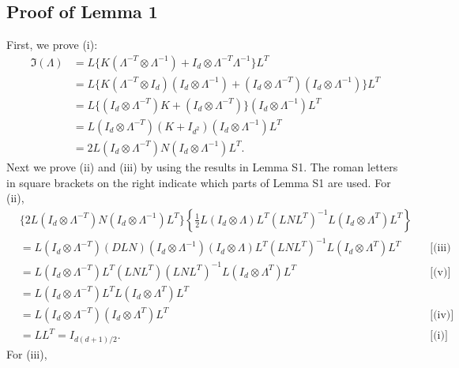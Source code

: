 \documentclass{statsoc}
\begin{document}
\subsection{Proof of Lemma 1}
First, we prove (i):
\begin{align*}
\mathfrak{I}(\Lambda) 
&= L \{ K(\Lambda^{-T} \otimes \Lambda^{-1} ) + I_d \otimes \Lambda^{-T}\Lambda^{-1} \} L^T \\ 
&= L \{ K(\Lambda^{-T} \otimes I_d)(I_d \otimes \Lambda^{-1} ) + ( I_d \otimes \Lambda^{-T}) ( I_d \otimes \Lambda^{-1}) \}L^T\\ 
&= L \{ ( I_d \otimes \Lambda^{-T}) K+ ( I_d \otimes \Lambda^{-T}) \} ( I_d \otimes \Lambda^{-1})L^T\\ 
&= L ( I_d \otimes \Lambda^{-T})(K+ I_{d^2}) ( I_d \otimes \Lambda^{-1})L^T\\ 
&= 2 L ( I_d \otimes \Lambda^{-T})N ( I_d \otimes \Lambda^{-1})L^T.
\end{align*}
Next we prove (ii) and (iii) by using the results in Lemma S1. The roman letters in square brackets on the right indicate which parts of Lemma S1 are used. For (ii),
\begin{align*}
&\{ 2 L  ( I_d \otimes \Lambda^{-T})N ( I_d \otimes \Lambda^{-1})L^T \} \left\{\tfrac{1}{2} L ( I_d \otimes \Lambda) L^T (L N L^T)^{-1} L (I_d \otimes \Lambda^T)  L^T \right\} \\
&= L  ( I_d \otimes \Lambda^{-T})(DL N) ( I_d \otimes \Lambda^{-1}) ( I_d \otimes \Lambda) L^T (L N L^T)^{-1} L (I_d \otimes \Lambda^T)  L^T && \text{[(iii) \& (iv)]} \\
&= L  ( I_d \otimes \Lambda^{-T})L^T (L N L^T)  (L N L^T)^{-1} L (I_d \otimes \Lambda^T)  L^T &&  \text{[(v)]}\\
&= L  ( I_d \otimes \Lambda^{-T})L^T L (I_d \otimes \Lambda^T) L^T \\
&= L  ( I_d \otimes \Lambda^{-T}) (I_d \otimes \Lambda^T) L^T && \text{[(iv)]}\\
&= L  L^T = I_{d(d+1)/2}. && \text{[(i)]}
\end{align*}
For (iii),
\end{document}
